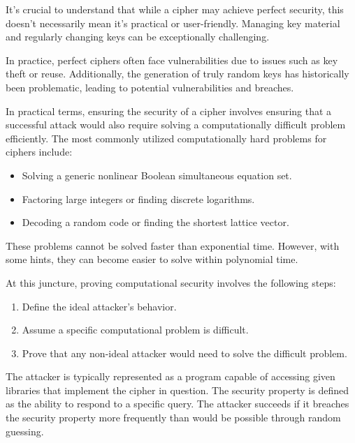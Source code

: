 It's crucial to understand that while a cipher may achieve perfect security, this doesn't necessarily mean it's practical or user-friendly.
Managing key material and regularly changing keys can be exceptionally challenging.

In practice, perfect ciphers often face vulnerabilities due to issues such as key theft or reuse. 
Additionally, the generation of truly random keys has historically been problematic, leading to potential vulnerabilities and breaches.

In practical terms, ensuring the security of a cipher involves ensuring that a successful attack would also require solving a computationally difficult problem efficiently. 
The most commonly utilized computationally hard problems for ciphers include:
\begin{itemize}
    \item Solving a generic nonlinear Boolean simultaneous equation set.
    \item Factoring large integers or finding discrete logarithms.
    \item Decoding a random code or finding the shortest lattice vector.
\end{itemize}
These problems cannot be solved faster than exponential time. 
However, with some hints, they can become easier to solve within polynomial time.

At this juncture, proving computational security involves the following steps:
\begin{enumerate}
    \item Define the ideal attacker's behavior.
    \item Assume a specific computational problem is difficult.
    \item Prove that any non-ideal attacker would need to solve the difficult problem.
\end{enumerate}
The attacker is typically represented as a program capable of accessing given libraries that implement the cipher in question.
The security property is defined as the ability to respond to a specific query.
The attacker succeeds if it breaches the security property more frequently than would be possible through random guessing.